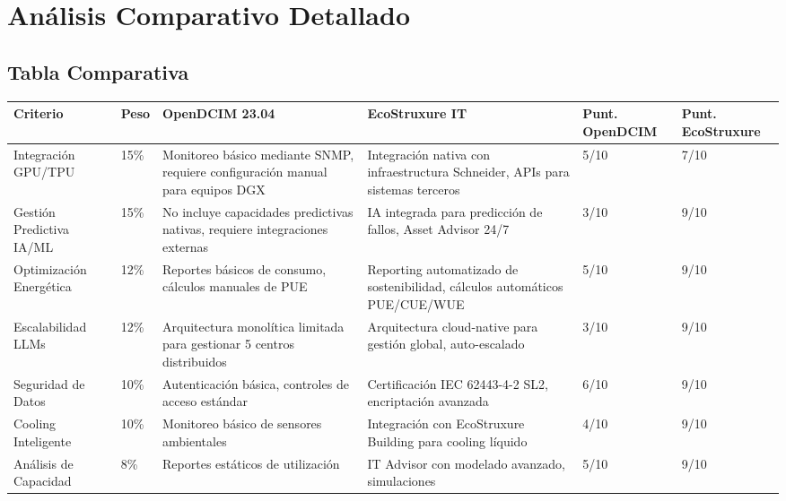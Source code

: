 \documentclass[12pt,a4paper]{article}
\begin{document}
\section{Análisis Comparativo Detallado}

\subsection{Tabla Comparativa}

\begin{center}
\begin{longtable}{|p{2.8cm}|p{1.0cm}|p{3.4cm}|p{3.4cm}|p{1.3cm}|p{1.3cm}|}
\hline
\textbf{Criterio} & \textbf{Peso} & \textbf{OpenDCIM 23.04} & \textbf{EcoStruxure IT} & \textbf{Punt. OpenDCIM} & \textbf{Punt. EcoStruxure} \\
\hline
\endhead

Integración GPU/TPU & 15\% & Monitoreo básico mediante SNMP, requiere configuración manual para equipos DGX & Integración nativa con infraestructura Schneider, APIs para sistemas terceros & 5/10 & 7/10 \\
\hline

Gestión Predictiva IA/ML & 15\% & No incluye capacidades predictivas nativas, requiere integraciones externas & IA integrada para predicción de fallos, Asset Advisor 24/7 & 3/10 & 9/10 \\
\hline

Optimización Energética & 12\% & Reportes básicos de consumo, cálculos manuales de PUE & Reporting automatizado de sostenibilidad, cálculos automáticos PUE/CUE/WUE & 5/10 & 9/10 \\
\hline

Escalabilidad LLMs & 12\% & Arquitectura monolítica limitada para gestionar 5 centros distribuidos & Arquitectura cloud-native para gestión global, auto-escalado & 3/10 & 9/10 \\
\hline

Seguridad de Datos & 10\% & Autenticación básica, controles de acceso estándar & Certificación IEC 62443-4-2 SL2, encriptación avanzada & 6/10 & 9/10 \\
\hline

Cooling Inteligente & 10\% & Monitoreo básico de sensores ambientales & Integración con EcoStruxure Building para cooling líquido & 4/10 & 9/10 \\
\hline

Análisis de Capacidad & 8\% & Reportes estáticos de utilización & IT Advisor con modelado avanzado, simulaciones & 5/10 & 9/10 \\
\hline


\end{longtable}
\end{center}
\end{document}
